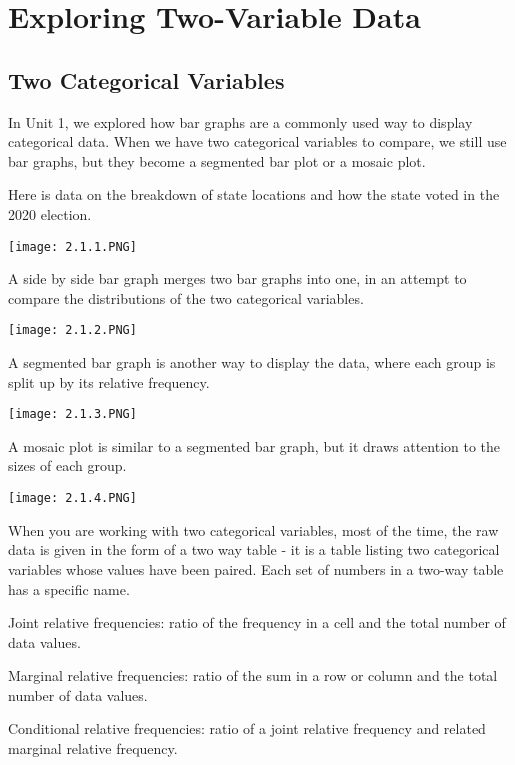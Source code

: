 \documentclass[../stats.tex]{subfiles}
\begin{document}
\chapter{Exploring Two-Variable Data}
\section{Two Categorical Variables}
In Unit 1, we explored how bar graphs are a commonly used way to display categorical data. When we have two categorical variables to compare, we still use bar graphs, but they become a segmented bar plot or a mosaic plot.

Here is data on the breakdown of state locations and how the state voted in the 2020 election.
\begin{center}
    \texttt{[image: 2.1.1.PNG]}
\end{center}

A side by side bar graph merges two bar graphs into one, in an attempt to compare the distributions of the two categorical variables.
\begin{center}
    \texttt{[image: 2.1.2.PNG]}
\end{center}

A segmented bar graph is another way to display the data, where each group is split up by its relative frequency.
\begin{center}
    \texttt{[image: 2.1.3.PNG]}
\end{center}

A mosaic plot is similar to a segmented bar graph, but it draws attention to the sizes of each group.
\begin{center}
    \texttt{[image: 2.1.4.PNG]}
\end{center}

When you are working with two categorical variables, most of the time, the raw data is given in the form of a two way table - it is a table 
listing two categorical variables whose values have been paired. Each set of numbers in a two-way table has a specific name.

Joint relative frequencies: ratio of the frequency in a cell and the total number of data values.

Marginal relative frequencies: ratio of the sum in a row or column and the total number of data values.

Conditional relative frequencies: ratio of a joint relative frequency and related marginal relative frequency.
\end{document}
